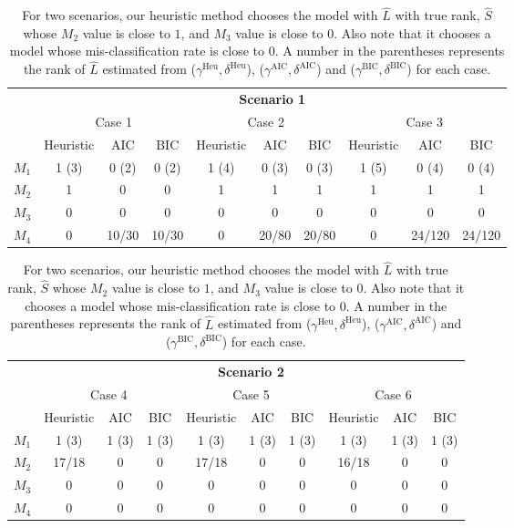 \documentclass[AMS,STIX1COL]{WileyNJD-v2}
\begin{document}
{\begin{table}[htbp]
\centering
    \begin{tabular}{c|ccc|ccc|ccc}
                & \multicolumn{9}{c}{\textbf{Scenario 1}}                                              \\
                \cline{2-10}
                & \multicolumn{3}{c|}{Case 1} & \multicolumn{3}{c|}{Case 2} & \multicolumn{3}{c}{Case 3} \\
                \cline{2-10}
                & Heuristic   & AIC   & BIC  & Heuristic   & AIC   & BIC  & Heuristic   & AIC   & BIC  \\
                \hline
    $M_{1}$   &    1 (3)  &    0 (2)   &  0 (2)  &    1 (4)    &  0 (3)   &  0 (3)  &    1 (5)  &   0 (4)    & 0 (4) \\
    $M_{2}$   &    1     &    0 &      0 &         1    &     1  &    1  &         1    &    1   &   1   \\
    $M_{3}$   &    0     &    0 &      0 &         0    &     0  &    0  &         0    &    0   &   0   \\
    $M_{4}$   &  0  &    10/30    &  10/30     &   0   &   20/80    &   20/80   &  0      &  24/120     &   24/120    \\
                \hline
    \end{tabular}

    \begin{tabular}{c|ccc|ccc|ccc}
                & \multicolumn{9}{c}{\textbf{Scenario 2}}                                              \\
                \cline{2-10}
                & \multicolumn{3}{c|}{Case 4} & \multicolumn{3}{c|}{Case 5} & \multicolumn{3}{c}{Case 6} \\
                \cline{2-10}
                & Heuristic   & AIC   & BIC  &    Heuristic   & AIC   & BIC  & Heuristic   & AIC   & BIC  \\
                \hline
    $M_{1}$   &   1 (3)     &     1 (3)  &  1 (3)    &      1 (3)   &   1 (3)    &  1 (3)    &   1 (3)     &  1 (3)   & 1 (3)   \\
    $M_{2}$   &   17/18   &   0    &    0  &   17/18     &   0    &  0    &  16/18    &   0    &  0    \\
    $M_{3}$   &   0 &     0  &   0   &        0     &    0   &  0    &        0     &   0    & 0 \\
    $M_{4}$   &  0  &   0    &  0    &   0          &   0    &   0   &  0      &  0     &   0   \\
                \hline
    \end{tabular}
    \caption{ For two scenarios, our heuristic method chooses the model with $\widehat{L}$ with true rank, $\widehat{S}$ whose $M_2$ value is close to $1$, and $M_3$ value is close to $0$.
    Also note that it chooses a model whose mis-classification rate is close to $0$.
    A number in the parentheses represents the rank of $\widehat{L}$ estimated from ($\gamma^{\text{Heu}},\delta^{\text{Heu}}$), ($\gamma^{\text{AIC}},\delta^{\text{AIC}}$) and ($\gamma^{\text{BIC}},\delta^{\text{BIC}}$) for each case.}
    \label{tab:table1}
\end{table}

}
\end{document}

